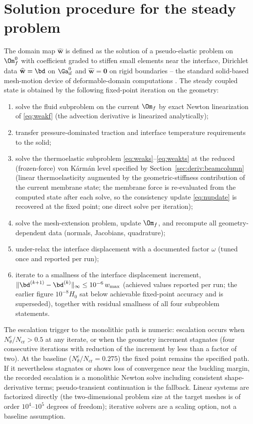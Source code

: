 \section{Solution procedure for the steady problem}
The domain map $\widehat{\mathbf w}$ is defined as the solution of a pseudo-elastic problem on
$\Om_f^0$ with coefficient graded to stiffen small elements near the interface, Dirichlet data
$\widehat{\mathbf w}=\bd$ on $\Ga_{\mathrm{if}}^0$ and $\widehat{\mathbf w}=\mathbf 0$ on rigid
boundaries -- the standard solid-based mesh-motion device of deformable-domain computations
\cite{lesoinne1996geometric}. The steady coupled state is obtained by the following fixed-point
iteration on the geometry:
\begin{enumerate}\itemsep1pt
\item solve the fluid subproblem on the current $\Om_f$ by exact Newton linearization of
\eqref{eq:weakf} (the advection derivative is linearized analytically);
\item transfer pressure-dominated traction and interface temperature requirements to the solid;
\item solve the thermoelastic subproblem \eqref{eq:weaks}--\eqref{eq:weakts} at the reduced
(frozen-force) von K\'arm\'an level specified by Section~\ref{sec:deriv:beamcolumn} (linear
thermoelasticity augmented by the geometric-stiffness contribution of the current membrane
state; the membrane force is re-evaluated from the computed state after each solve, so the
consistency update \eqref{eq:nupdate} is recovered at the fixed point; one direct solve per
iteration);
\item solve the mesh-extension problem, update $\Om_f$, and recompute all geometry-dependent
data (normals, Jacobians, quadrature);
\item under-relax the interface displacement with a documented factor $\omega$
(tuned once and reported per run);
\item iterate to a smallness of the interface displacement increment,
$\|\bd^{(k+1)}-\bd^{(k)}\|_\infty\le10^{-6}\,w_{\max}$
(achieved values reported per run; the earlier figure $10^{-8}H_0$ sat below achievable
fixed-point accuracy and is superseded), together with residual smallness of all four
subproblem statements.
\end{enumerate}
The escalation trigger to the monolithic path is numeric: escalation occurs when
$N_\theta^c/N_{\mathrm{cr}}>0.5$ at any iterate, or when the geometry increment stagnates
(four consecutive iterations with reduction of the increment by less than a factor of two). At
the baseline ($N_\theta^c/N_{\mathrm{cr}}=0.275$) the fixed point remains the specified path.
If it nevertheless stagnates or shows loss of convergence near the buckling margin,
the recorded escalation is a monolithic Newton solve including consistent shape-derivative terms;
pseudo-transient continuation is the fallback. Linear systems are factorized directly (the
two-dimensional problem size at the target meshes is of order $10^4$--$10^5$ degrees of freedom);
iterative solvers are a scaling option, not a baseline assumption.

